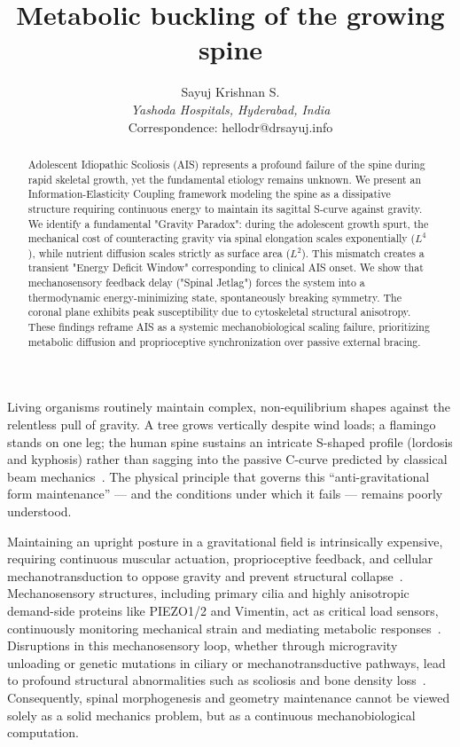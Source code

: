 \documentclass[11pt]{article}
\title{Metabolic buckling of the growing spine}
\author{Sayuj Krishnan S. \\
\textit{Yashoda Hospitals, Hyderabad, India} \\
Correspondence: hellodr@drsayuj.info}
\date{}
\begin{document}
\maketitle

\begin{abstract}
Adolescent Idiopathic Scoliosis (AIS) represents a profound failure of the spine during rapid skeletal growth, yet the fundamental etiology remains unknown. We present an Information-Elasticity Coupling framework modeling the spine as a dissipative structure requiring continuous energy to maintain its sagittal S-curve against gravity. We identify a fundamental "Gravity Paradox": during the adolescent growth spurt, the mechanical cost of counteracting gravity via spinal elongation scales exponentially ($L^4$), while nutrient diffusion scales strictly as surface area ($L^2$). This mismatch creates a transient "Energy Deficit Window" corresponding to clinical AIS onset. We show that mechanosensory feedback delay ("Spinal Jetlag") forces the system into a thermodynamic energy-minimizing state, spontaneously breaking symmetry. The coronal plane exhibits peak susceptibility due to cytoskeletal structural anisotropy. These findings reframe AIS as a systemic mechanobiological scaling failure, prioritizing metabolic diffusion and proprioceptive synchronization over passive external bracing.
\end{abstract}

Living organisms routinely maintain complex, non-equilibrium shapes against the relentless pull of gravity. A tree grows vertically despite wind loads; a flamingo stands on one leg; the human spine sustains an intricate S-shaped profile (lordosis and kyphosis) rather than sagging into the passive C-curve predicted by classical beam mechanics~\cite{thompson1917growth, goriely2017mathematics, niklas1994plant}. The physical principle that governs this ``anti-gravitational form maintenance'' --- and the conditions under which it fails --- remains poorly understood.

Maintaining an upright posture in a gravitational field is intrinsically expensive, requiring continuous muscular actuation, proprioceptive feedback, and cellular mechanotransduction to oppose gravity and prevent structural collapse~\cite{latimer2005upright, bastien2013unifying, govey2013gravity, proximo2012proprioception}. Mechanosensory structures, including primary cilia and highly anisotropic demand-side proteins like PIEZO1/2 and Vimentin, act as critical load sensors, continuously monitoring mechanical strain and mediating metabolic responses~\cite{Assaraf_2020, Coste_2010, wuest2025vim}. Disruptions in this mechanosensory loop, whether through microgravity unloading or genetic mutations in ciliary or mechanotransductive pathways, lead to profound structural abnormalities such as scoliosis and bone density loss~\cite{lv2023yap, djebar2024astrogliosis, ramli2024piezo1}. Consequently, spinal morphogenesis and geometry maintenance cannot be viewed solely as a solid mechanics problem, but as a continuous mechanobiological computation.
\end{document}
